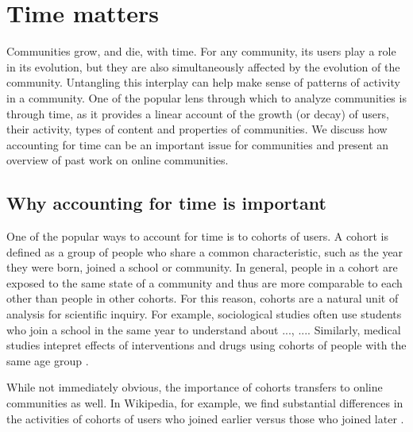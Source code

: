\section{Time matters}  %

Communities grow, and die, with time. For any community, its users play a role in its evolution, but they are also simultaneously affected by the evolution of the community. Untangling this interplay can help make sense of patterns of activity in a community.
One of the popular lens through which to analyze communities is through time, as it provides a linear account of the growth (or decay) of users, their activity, types of content and properties of communities. We discuss how accounting for time can be an important issue for communities and present an overview of past work on online communities.
\subsection{Why accounting for time is important}
One of the popular ways to account for time is to cohorts of users. A cohort is defined as a group of people who share a common characteristic, such as the year they were born, joined a school or community. In general, people in a cohort are exposed to the same state of a community and thus are more comparable to each other than people in other cohorts. For this reason, cohorts are a natural unit of analysis for scientific inquiry. For example, sociological studies often use students who join a school in the same year to understand about ..., ...\cite{}. Similarly, medical studies intepret effects of interventions and drugs using cohorts of people with the same age group \cite{}.

While not immediately obvious, the importance of cohorts transfers to online communities as well. In Wikipedia, for example, we find substantial differences in the activities of cohorts of users who joined earlier versus those who joined later \cite{Welser2011a}.

